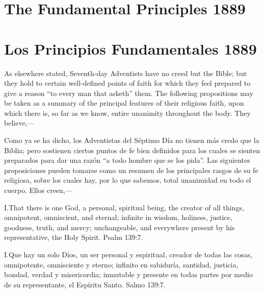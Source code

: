  \label{chap:appendix}


 \label{chap:appendix}






\section*{The Fundamental Principles 1889}


\section*{Los Principios Fundamentales 1889}


As elsewhere stated, Seventh-day Adventists have no creed but the Bible; but they hold to certain well-defined points of faith for which they feel prepared to give a reason “to every man that asketh” them. The following propositions may be taken as a summary of the principal features of their religious faith, upon which there is, so far as we know, entire unanimity throughout the body. They believe,—


Como ya se ha dicho, los Adventistas del Séptimo Día no tienen más credo que la Biblia; pero sostienen ciertos puntos de fe bien definidos para los cuales se sienten preparados para dar una razón “a todo hombre que se los pida”. Las siguientes proposiciones pueden tomarse como un resumen de los principales rasgos de su fe religiosa, sobre los cuales hay, por lo que sabemos, total unanimidad en todo el cuerpo. Ellos creen,—


\lettrine{I.} That there is one God, a personal, spiritual being, the creator of all things, omnipotent, omniscient, and eternal; infinite in wisdom, holiness, justice, goodness, truth, and mercy; unchangeable, and everywhere present by his representative, the Holy Spirit. Psalm 139:7.


\lettrine{I.} Que hay un solo Dios, un ser personal y espiritual, creador de todas las cosas, omnipotente, omnisciente y eterno; infinito en sabiduría, santidad, justicia, bondad, verdad y misericordia; inmutable y presente en todas partes por medio de su representante, el Espíritu Santo. Salmo 139:7.


